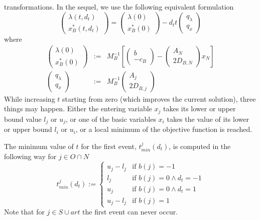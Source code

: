 \documentclass[a4paper]{article}
\begin{document}
transformations. In the sequel, we use the following equivalent formulation
\begin{equation}
\label{eq:Ratio_Test_1_Opt_sol_t}
\left(
\begin{array}{c}
\lambda(t, d_{t}) \\
\hline
x_{B}^{*}(t, d_{t})
\end{array}
\right)
=
\left(
\begin{array}{c}
\lambda(0) \\
\hline
x_{B}^{*}(0)
\end{array}
\right)
-
d_{t}t
\left(
\begin{array}{c}
q_{\lambda} \\
\hline
q_{x}
\end{array}
\right)
\end{equation}
where
\begin{eqnarray}
\left(
\begin{array}{c}
\lambda(0) \\
\hline
x_{B}^{*}(0)
\end{array}
\right)
&:=&
M_{B}^{-1}
\left[
\left(
\begin{array}{c}
b \\
\hline
-c_{B}
\end{array}
\right)
-
\left(
\begin{array}{c}
A_{N} \\
\hline
2D_{B,N}
\end{array}
\right)
x_{N}
\right]
\\
\left(
\begin{array}{c}
q_{\lambda} \\
\hline
q_{x}
\end{array}
\right)
&:=&
M_{B}^{-1}
\left(
\begin{array}{c}
A_{j} \\
\hline
2D_{B,j}
\end{array}
\right)
\end{eqnarray}
While increasing $t$ starting from zero (which improves the current solution),
three things may happen. Either the entering variable $x_{j}$ takes its lower or
upper bound value $l_{j}$ or $u_{j}$, or one of the basic variables $x_{i}$
takes the value of its lower or upper bound $l_{i}$ or $u_{i}$, or a local
minimum of the objective function is reached.

The minimum value of $t$ for the first event, $t_{min}^{j}(d_{t})$, is computed
in the following way for $j \in O \cap N$
\begin{equation}
\label{def:t_min_j}
t_{min}^{j}(d_{t}):=
\left\{
\begin{array}{ll}
u_{j}-l_{j}
&
\text{if $b(j)=-1$} \\
l_{j}
&
\text{if $b(j)=0 \wedge d_{t}=-1$} \\
u_{j}
&
\text{if $b(j)=0 \wedge d_{t}=1$} \\
u_{j}-l_{j}
&
\text{if $b(j)=1$}
\end{array}
\right.
\end{equation}
Note that for $j \in S \cup art$ the first event can never occur.
\end{document}
